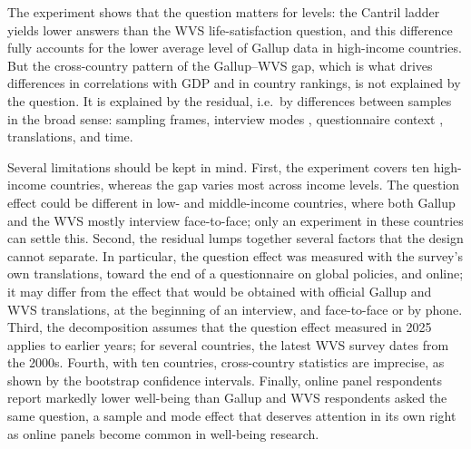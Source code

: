 The experiment shows that the question matters for levels: the Cantril ladder yields lower answers than the WVS life-satisfaction question, and this difference fully accounts for the lower average level of Gallup data in high-income countries. But the cross-country pattern of the Gallup--WVS gap, which is what drives differences in correlations with GDP and in country rankings, is not explained by the question. It is explained by the residual, i.e.\ by differences between samples in the broad sense: sampling frames, interview modes \citep{dolan_happy_2016,conti_survey_2011}, questionnaire context \citep{deaton_financial_2012,deaton_understanding_2016}, translations, and time.

Several limitations should be kept in mind. First, the experiment covers ten high-income countries, whereas the gap varies most across income levels. The question effect could be different in low- and middle-income countries, where both Gallup and the WVS mostly interview face-to-face; only an experiment in these countries can settle this. Second, the residual lumps together several factors that the design cannot separate. In particular, the question effect was measured with the survey's own translations, toward the end of a questionnaire on global policies, and online; it may differ from the effect that would be obtained with official Gallup and WVS translations, at the beginning of an interview, and face-to-face or by phone. Third, the decomposition assumes that the question effect measured in 2025 applies to earlier years; for several countries, the latest WVS survey dates from the 2000s. Fourth, with ten countries, cross-country statistics are imprecise, as shown by the bootstrap confidence intervals. Finally, online panel respondents report markedly lower well-being than Gallup and WVS respondents asked the same question, a sample and mode effect that deserves attention in its own right as online panels become common in well-being research.
